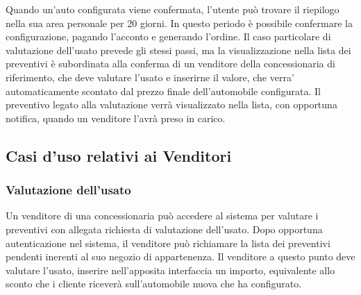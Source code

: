 \documentclass[openany, 12pt]{report}
\begin{document}
Quando un'auto configurata viene confermata, l'utente pu\`o trovare il riepilogo nella sua area personale per 20 giorni.
In questo periodo \`e possibile confermare la configurazione, pagando l'acconto e generando l'ordine. Il caso particolare
di valutazione dell'usato prevede gli stessi passi, ma la visualizzazione nella lista dei preventivi \`e subordinata alla
conferma di un venditore della concessionaria di riferimento, che deve valutare l'usato e inserirne il valore, che verra'
automaticamente scontato dal prezzo finale dell'automobile configurata. Il preventivo legato alla valutazione verr\`a
visualizzato nella lista, con opportuna notifica, quando un venditore l'avr\`a preso in carico.

\mdseries

\subsection{Casi d'uso relativi ai Venditori}

\subsubsection{Valutazione dell'usato}
Un venditore di una concessionaria pu\`o accedere al sistema per valutare i preventivi con allegata richiesta di
valutazione dell'usato. Dopo opportuna autenticazione nel sistema, il venditore pu\`o richiamare la lista dei preventivi
pendenti inerenti al suo negozio di appartenenza. Il venditore a questo punto deve valutare l'usato, inserire nell'apposita interfaccia un importo, equivalente allo sconto che i cliente ricever\`a sull'automobile nuova che ha configurato.
\end{document}
